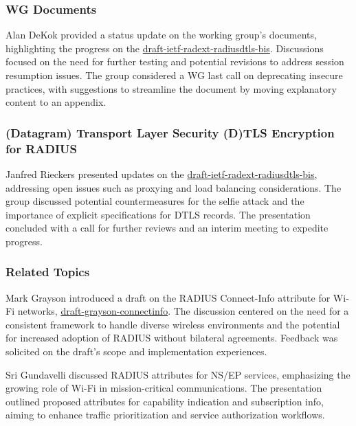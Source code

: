 \documentclass{article}
\begin{document}
\subsubsection{WG Documents}

Alan DeKok provided a status update on the working group's documents, highlighting the progress on the \href{https://datatracker.ietf.org/doc/html/draft-ietf-radext-radiusdtls-bis}{draft-ietf-radext-radiusdtls-bis}. Discussions focused on the need for further testing and potential revisions to address session resumption issues. The group considered a WG last call on deprecating insecure practices, with suggestions to streamline the document by moving explanatory content to an appendix.

\subsubsection{(Datagram) Transport Layer Security (D)TLS Encryption for RADIUS}

Janfred Rieckers presented updates on the \href{https://datatracker.ietf.org/doc/html/draft-ietf-radext-radiusdtls-bis}{draft-ietf-radext-radiusdtls-bis}, addressing open issues such as proxying and load balancing considerations. The group discussed potential countermeasures for the selfie attack and the importance of explicit specifications for DTLS records. The presentation concluded with a call for further reviews and an interim meeting to expedite progress.

\subsubsection{Related Topics}

Mark Grayson introduced a draft on the RADIUS Connect-Info attribute for Wi-Fi networks, \href{https://datatracker.ietf.org/doc/html/draft-grayson-connectinfo}{draft-grayson-connectinfo}. The discussion centered on the need for a consistent framework to handle diverse wireless environments and the potential for increased adoption of RADIUS without bilateral agreements. Feedback was solicited on the draft's scope and implementation experiences.

Sri Gundavelli discussed RADIUS attributes for NS/EP services, emphasizing the growing role of Wi-Fi in mission-critical communications. The presentation outlined proposed attributes for capability indication and subscription info, aiming to enhance traffic prioritization and service authorization workflows.
\end{document}

